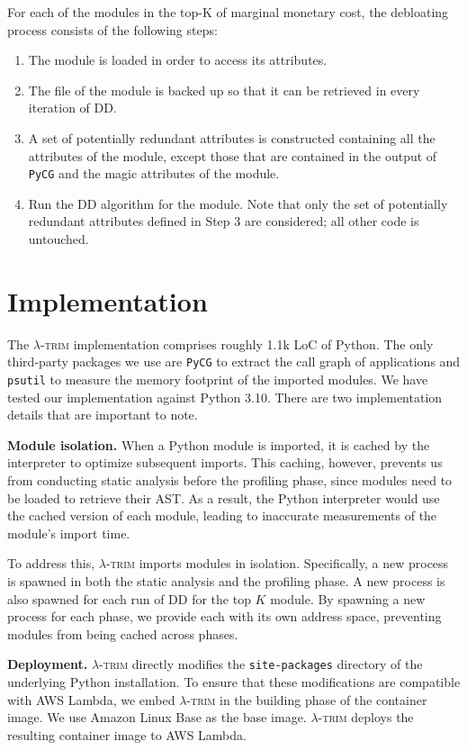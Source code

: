 \documentclass[sigplan,screen]{acmart}
\newenvironment{vinenum}
{\begin{enumerate}[leftmargin=2.5em]
  \setlength{\itemsep}{0pt}
  \setlength{\labelwidth}{1em}
\setlength{\parsep}{0pt}
\setlength{\topsep}{0pt}
  \setlength{\partopsep}{0px}
  }
{\end{enumerate}}
\newcommand{\sys}{\textsc{\ensuremath{\lambda}-trim}\xspace}
\newcommand{\heading}[1]{\vspace{4pt}\noindent\textbf{#1.}}
\begin{document}
For each of the modules in the top-K of marginal monetary cost, the debloating process consists of the following steps:

\begin{vinenum}
    \item The module is loaded in order to access its attributes.
    \item The  file of the module is backed up so that it can be retrieved in every iteration of DD.
    \item A set of potentially redundant attributes is constructed containing all the attributes of the module, except those that are contained in the output of \texttt{PyCG} and the magic attributes of the module.
    \item Run the DD algorithm for the module.
    Note that only the set of potentially redundant attributes defined in Step 3 are considered; all other code is untouched.
\end{vinenum}


 
\section{Implementation}

The \sys implementation comprises roughly 1.1k LoC of Python.
The only third-party packages we use are \texttt{PyCG} \cite{pycg2021} to extract the call graph of applications
and \texttt{psutil} to measure the memory footprint of the imported modules.
We have tested our implementation against Python 3.10.
There are two implementation details that are important to note.

\heading{Module isolation} When a Python module is imported, it is cached by the interpreter to optimize subsequent imports. 
This caching, however, prevents us from conducting static analysis before the profiling phase, since modules need to be loaded to retrieve their AST.
As a result, the Python interpreter would use the cached version of each module, leading to inaccurate measurements of the module's import time.

To address this, \sys imports modules in isolation.
Specifically, a new process is spawned in both the static analysis and the profiling phase.
A new process is also spawned for each run of DD for the top $K$ module.
By spawning a new process for each phase, we provide each with its own address space, preventing modules from being cached across phases.

\heading{Deployment} \sys directly modifies the \texttt{site-packages} directory of the underlying Python installation.
To ensure that these modifications are compatible with AWS Lambda, we embed \sys in the building phase of the container image.
We use Amazon Linux Base as the base image.
\sys deploys the resulting container image to AWS Lambda.
 
\end{document}
